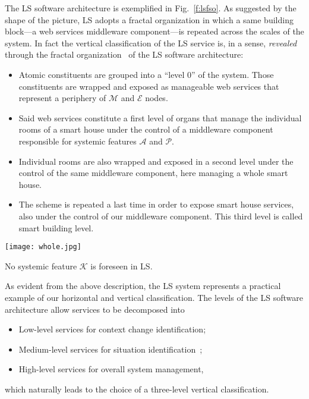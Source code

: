 \documentclass[twocolumn]{svjour3}
\def\M{\hbox{$\mathcal{M}$}}
\def\A{\hbox{$\mathcal{A}$}}
\def\P{\hbox{$\mathcal{P}$}}
\def\E{\hbox{$\mathcal{E}$}}
\def\K{\hbox{$\mathcal{K}$}}
\begin{document}
The LS software architecture is exemplified in Fig.~\ref{f:lsfso}. As suggested by the shape
of the picture, LS adopts a fractal organization
in which a same building block---a web services middleware component---is repeated across
the scales of the system. In fact the vertical classification of the LS service is, in a sense,
\emph{revealed\/} through the fractal organization~\cite{Koe67,Warnecke93,Tharu96,TWN1998}
of the LS software architecture:
\begin{itemize}
\item Atomic constituents are grouped into a ``level 0'' of the system. Those constituents are
wrapped and exposed as manageable web services that represent a periphery of \M{} and \E{} nodes.
\item Said web services constitute
a first level of organs that manage the individual rooms of a smart house under the control
of a middleware component responsible for systemic features \A{} and \P.
\item Individual rooms are also wrapped and exposed in a second level under the control of
the same middleware component, here managing a whole smart house.
\item The scheme is repeated a last time in order to expose smart house services, also
under the control of our middleware component. This third level is called smart building level.
\end{itemize}

\begin{figure*}
\centerline{\texttt{[image: whole.jpg]}}
\caption{Exemplification of the LS software architecture.}
\label{f:lsfso}
\end{figure*}

No systemic feature \K{} is foreseen in LS.

As evident from the above description, the LS system represents a practical
example of our horizontal and vertical classification. The levels of the LS
software architecture allow services to be decomposed into
\begin{itemize}
\item Low-level services for context change identification;
\item Medium-level services for situation identification~\cite{YeDM12};
\item High-level services for overall system management,
\end{itemize}
which naturally leads to the choice of a three-level vertical classification.
\end{document}
